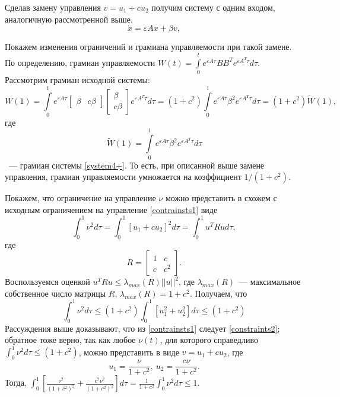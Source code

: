 \documentclass[../main.tex]{subfiles}
\begin{document}
 Сделав   замену  управления $ v = u_1 + c u_2 $ получим систему с одним входом, аналогичную рассмотренной выше.
 \begin{equation}\label{system4+}
	 \dot{x} = \varepsilon A x + \beta v, 
 \end{equation}
 
 Покажем изменения ограничений и грамиана управляемости при такой замене.
 По определению, грамиан управляемости $ W(t) = \int \limits_0 ^ t e^{\varepsilon A\tau} B B^T e^{\varepsilon A^T\tau} d\tau  $. Рассмотрим грамиан исходной системы: 
 \begin{equation*}
	 W(1) = \int \limits_0 ^ 1 e^{\varepsilon A\tau}  \left[ \begin{array}{cc}
		 \beta & c \beta
	 \end{array} \right] \left[ \begin{array}{c}
		 \beta
		 \\ c \beta 
	 \end{array} \right] e^{\varepsilon A^T\tau} d\tau = (1 + c^2)  \int \limits_0 ^ 1 e^{\varepsilon A\tau} \beta^2 e^{\varepsilon A^T\tau} d\tau = (1 + c^2) \tilde{W}(1),
 \end{equation*}
 где 
 \begin{equation*}
	 \tilde{W}(1) = \int \limits_0 ^ 1 e^{\varepsilon A\tau} \beta^2 e^{\varepsilon A^T\tau} d\tau 
 \end{equation*}
~--- грамиан системы \eqref{system4+}. То есть, при описанной выше замене управления, грамиан управляемости умножается на коэффициент $ 1/(1 + c^2)$.
 
 
 Покажем, что ограничение на управление $ \nu $  можно представить в схожем с исходным ограничением на управление \eqref{contrainsts1} виде
 \begin{equation*}
	 \int_{0}^{1} \nu ^2 d \tau  = \int_{0}^{1} \left[ u_1 + c u_2 \right]^2 d \tau =  \int_{0}^{1} u^T  R u d \tau,
 \end{equation*}
 где 
 \begin{equation*}
	 R = \left[ \begin{array}{cc}
		 1 & c \\ 
		 c & c^2
	 \end{array} \right].
 \end{equation*}
 Воспользуемся оценкой $
 u^T R u \leq \lambda_{max}(R) || u ||^2 $, где $ \lambda_{max}(R) $~--- максимальное собственное число матрицы $ R $, $ \lambda_{max}(R)  = 1 + c^2 $.
 Получаем, что
 \begin{equation}\label{constraints2}
	 \int_{0}^{1} \nu ^2 d \tau \leq (1 + c^2) \int_{0}^{1} \left[ u_1^2 + u_2^2 \right] d \tau \leq (1 + c^2)
 \end{equation}
 Рассуждения выше доказывают, что из \eqref{contrainsts1} следует \eqref{constraints2}; обратное тоже верно, так как любое $ \nu(t) $, для которого справедливо $ \int_{0}^{1} \nu ^2 d \tau \leq (1 + c^2) $, можно представить в виде $ v = u_1 + c u_2 $, где 
 \begin{equation*}
	 u_1 = \frac{\nu}{1+c^2}, \ u_2 = \frac{c \nu}{1+c^2}.
 \end{equation*}
 Тогда, $ \int_0^1 \left[ \frac{\nu^2}{(1+c^2)^2} + \frac{c^2 \nu^2}{(1+c^2)^2}\right] d \tau = \frac{1}{1+c^2} \int_{0}^{1} \nu ^2 d \tau  \leq 1 $. 
 
\end{document}
